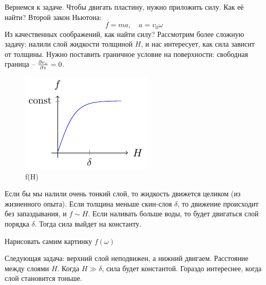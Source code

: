 Вернемся к задаче. Чтобы двигать пластину, нужно приложить силу. Как её найти? Второй закон Ньютона:
\begin{equation}
    f=ma, \quad a=v_0 \omega
\end{equation}
Из качественных соображений, как найти силу? Рассмотрим более сложную задачу: налили слой жидкости толщиной $H$, и нас интересует, как сила зависит от толщины. Нужно поставить граничное условие на поверхности: свободная граница -- $\pdv{v_x}{z}=0$.

\begin{figure}[tb]
    \centering
    \includegraphics[scale=1.5]{img/fH}
    \caption{f(H)}
    \label{fig:figure1}
\end{figure}

Если бы мы налили очень тонкий слой, то жидкость движется целиком (из жизненного опыта). Если толщина меньше скин-слоя $\delta$, то движение происходит без запаздывания, и $f \sim H$. Если наливать больше воды, то будет двигаться слой порядка $\delta$. Тогда сила выйдет на константу.

Нарисовать самим картинку $f(\omega)$

Следующая задача: верхний слой неподвижен, а нижний двигаем. Расстояние между слоями $H$. Когда $H \gg \delta$, сила будет константой. Гораздо интереснее, когда слой становится тоньше.



